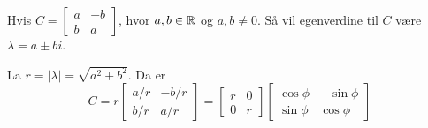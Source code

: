 Hvis $C = \begin{bmatrix}a&-b\\b&a\end{bmatrix}$,
hvor $a,b\in\mathbb{R}$ og $a,b\neq 0$.
Så vil egenverdine til $C$ være $\lambda = a \pm bi$.

La $r = |\lambda| = \sqrt{a^2 + b^2}$.
Da er
$$C = r\begin{bmatrix}
         a/r & -b/r \\
         b/r & a/r
       \end{bmatrix}
  = \begin{bmatrix} r & 0 \\ 0 & r \end{bmatrix}
    \begin{bmatrix} \cos{\phi} & -\sin{\phi} \\
                    \sin{\phi} & \cos{\phi} \end{bmatrix}
$$
